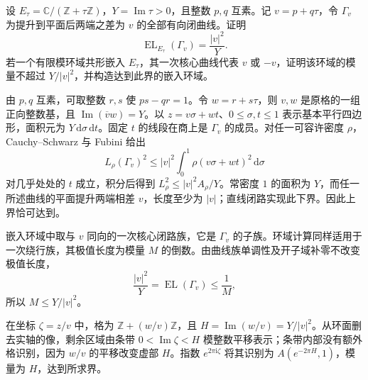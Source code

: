 \begin{exercise}
	\label{g4:ex:0505:torus-extremal-length}
	设 \(E_\tau=\mathbb C/(\mathbb Z+\tau\mathbb Z)\)，\(Y=\operatorname{Im}\tau>0\)，且整数 \(p,q\) 互素。记 \(v=p+q\tau\)，令 \(\Gamma_v\) 为提升到平面后两端之差为 \(v\) 的全部有向闭曲线。证明
	\[
		\operatorname{EL}_{E_\tau}(\Gamma_v)=\frac{|v|^2}{Y}.
	\]
	若一个有限模环域共形嵌入 \(E_\tau\)，其一次核心曲线代表 \(v\) 或 \(-v\)，证明该环域的模量不超过 \(Y/|v|^2\)，并构造达到此界的嵌入环域。
\end{exercise}
\begin{solution}
	由 \(p,q\) 互素，可取整数 \(r,s\) 使 \(ps-qr=1\)。令 \(w=r+s\tau\)，则 \(v,w\) 是原格的一组正向整数基，且 \(\operatorname{Im}(\overline v w)=Y\)。以 \(z=v\sigma+wt\)、\(0\le\sigma,t\le1\) 表示基本平行四边形，面积元为 \(Y\,\mathrm{d}\sigma\,\mathrm{d}t\)。固定 \(t\) 的线段在商上是 \(\Gamma_v\) 的成员。对任一可容许密度 \(\rho\)，Cauchy--Schwarz 与 Fubini 给出
	\[
		L_\rho(\Gamma_v)^2
		\le |v|^2\int_0^1\rho(v\sigma+wt)^2\,\mathrm{d}\sigma
	\]
	对几乎处处的 \(t\) 成立，积分后得到 \(L_\rho^2\le |v|^2A_\rho/Y\)。常密度 \(1\) 的面积为 \(Y\)，而任一所述曲线的平面提升两端相差 \(v\)，长度至少为 \(|v|\)；直线闭路实现此下界。因此上界恰可达到。

	嵌入环域中取与 \(v\) 同向的一次核心闭路族，它是 \(\Gamma_v\) 的子族。环域计算同样适用于一次绕行族，其极值长度为模量 \(M\) 的倒数。由曲线族单调性及开子域补零不改变极值长度，
	\[
		\frac{|v|^2}{Y}=\operatorname{EL}(\Gamma_v)\le\frac1M,
	\]
	所以 \(M\le Y/|v|^2\)。

	在坐标 \(\zeta=z/v\) 中，格为 \(\mathbb Z+(w/v)\mathbb Z\)，且 \(H=\operatorname{Im}(w/v)=Y/|v|^2\)。从环面删去实轴的像，剩余区域由条带 \(0<\operatorname{Im}\zeta<H\) 模整数平移表示；条带内部没有额外格识别，因为 \(w/v\) 的平移改变虚部 \(H\)。指数 \(e^{2\pi\mathrm{i}\zeta}\) 将其识别为 \(A(e^{-2\pi H},1)\)，模量为 \(H\)，达到所求界。
\end{solution}

